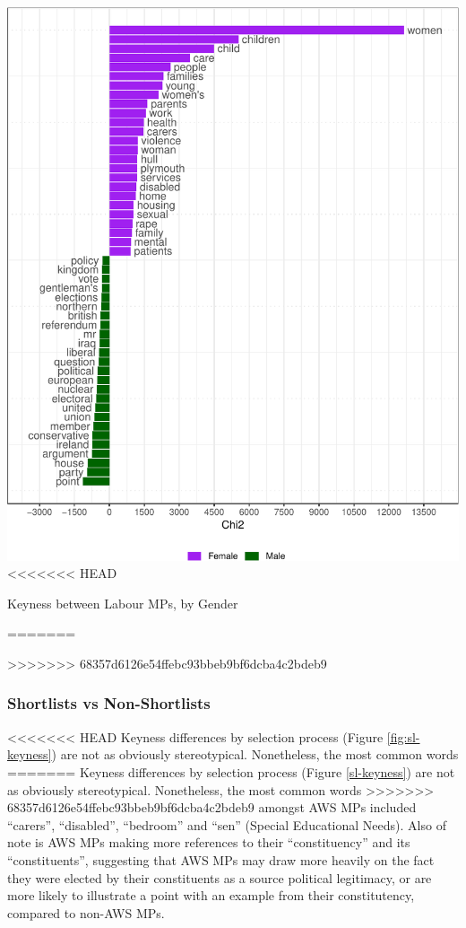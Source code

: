 \documentclass[]{article}
\let\origfigure\figure
\let\endorigfigure\endfigure
\renewenvironment{figure}[1][2] {
    \expandafter\origfigure\expandafter[H]
} {
    \endorigfigure
}
\theoremstyle{definition}
\theoremstyle{definition}
\theoremstyle{definition}
\theoremstyle{remark}
\begin{document}
\begin{table}[H]
\begin{table}[H]
\begin{table}[H]
\begin{table}[H]
\begin{table}[H]
\begin{table}[H]
\begin{table}[H]
\begin{table}[H]
\begin{figure}
\centering
\includegraphics{methodology_files/figure-latex/gender-keyness-plot-1.pdf}
<<<<<<< HEAD
\caption{\label{fig:gender-keyness-plot}Keyness between Labour MPs, by
Gender}
=======
\caption{\label{gender-keyness}Keyness between Labour MPs, by Gender}
>>>>>>> 68357d6126e54ffebc93bbeb9bf6dcba4c2bdeb9
\end{figure}

\hypertarget{shortlists-vs-non-shortlists-1}{%
\subsubsection{Shortlists vs
Non-Shortlists}\label{shortlists-vs-non-shortlists-1}}

<<<<<<< HEAD
Keyness differences by selection process (Figure \ref{fig:sl-keyness})
are not as obviously stereotypical. Nonetheless, the most common words
=======
Keyness differences by selection process (Figure \ref{sl-keyness}) are
not as obviously stereotypical. Nonetheless, the most common words
>>>>>>> 68357d6126e54ffebc93bbeb9bf6dcba4c2bdeb9
amongst AWS MPs included ``carers'', ``disabled'', ``bedroom'' and
``sen'' (Special Educational Needs). Also of note is AWS MPs making more
references to their ``constituency'' and its ``constituents'',
suggesting that AWS MPs may draw more heavily on the fact they were
elected by their constituents as a source political legitimacy, or are
more likely to illustrate a point with an example from their
constitutency, compared to non-AWS MPs.


\end{table}
\end{table}
\end{table}
\end{table}
\end{table}
\end{table}
\end{table}
\end{table}
\end{document}
